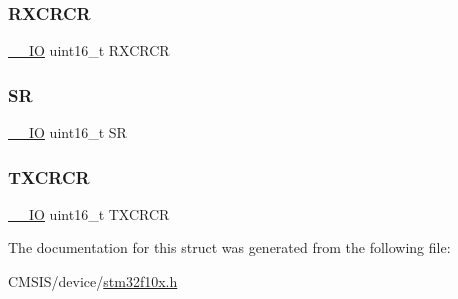 \mbox{\label{struct_s_p_i___type_def_a7ad53aa3735ccdd785e3eec02faf5eb9}} 
\subsubsection{\texorpdfstring{RXCRCR}{RXCRCR}}
{\footnotesize\ttfamily \mbox{\hyperlink{core__sc300_8h_aec43007d9998a0a0e01faede4133d6be}{\+\_\+\+\_\+\+IO}} uint16\+\_\+t R\+X\+C\+R\+CR}

\mbox{\label{struct_s_p_i___type_def_a44962ea5442d203bf4954035d1bfeb9d}} 
\subsubsection{\texorpdfstring{SR}{SR}}
{\footnotesize\ttfamily \mbox{\hyperlink{core__sc300_8h_aec43007d9998a0a0e01faede4133d6be}{\+\_\+\+\_\+\+IO}} uint16\+\_\+t SR}

\mbox{\label{struct_s_p_i___type_def_a0238d40f977d03709c97033b8379f98f}} 
\subsubsection{\texorpdfstring{TXCRCR}{TXCRCR}}
{\footnotesize\ttfamily \mbox{\hyperlink{core__sc300_8h_aec43007d9998a0a0e01faede4133d6be}{\+\_\+\+\_\+\+IO}} uint16\+\_\+t T\+X\+C\+R\+CR}



The documentation for this struct was generated from the following file\+:\begin{DoxyCompactItemize}
\item 
C\+M\+S\+I\+S/device/\mbox{\hyperlink{stm32f10x_8h}{stm32f10x.\+h}}\end{DoxyCompactItemize}
